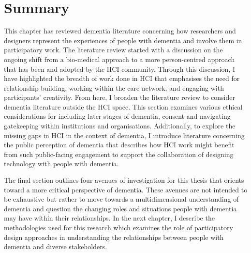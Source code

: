 \section{Summary}
\label{BL:summary}
This chapter has reviewed dementia literature concerning how researchers and designers represent the experiences of people with dementia and involve them in participatory work. The literature review started with a discussion on the ongoing shift from a bio-medical approach to a more person-centred approach that has been and adopted by the HCI community. Through this discussion, I have highlighted the breadth of work done in HCI that emphasises the need for relationship building, working within the care network, and engaging with participants' creativity. From here, I broaden the literature review to consider dementia literature outside the HCI space. This section examines various ethical considerations for including later stages of dementia, consent and navigating gatekeeping within institutions and organisations. Additionally, to explore the missing gaps in HCI in the context of dementia, I introduce literature concerning the public perception of dementia that describes how HCI work might benefit from such public-facing engagement to support the collaboration of designing technology with people with dementia.

The final section outlines four avenues of investigation for this thesis that orients toward a more critical perspective of dementia. These avenues are not intended to be exhaustive but rather to move towards a multidimensional understanding of dementia and question the changing roles and situations people with dementia may have within their relationships. In the next chapter, I describe the methodologies used for this research which examines the role of participatory design approaches in understanding the relationships between people with dementia and diverse stakeholders.
